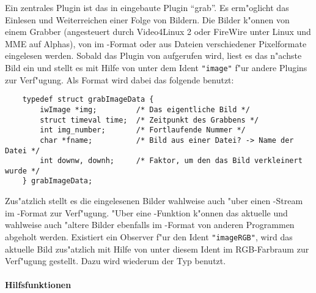 Ein zentrales Plugin ist das in \icewing{} eingebaute Plugin
``grab''. Es erm"oglicht das Einlesen und Weiterreichen einer Folge
von Bildern. Die Bilder k"onnen von einem Grabber (angesteuert durch
Video4Linux 2 oder FireWire unter Linux und MME auf Alphas), von
\dacs{} im -Format oder aus Dateien verschiedener
Pixelformate eingelesen werden. Sobald das Plugin von \icewing{}
aufgerufen wird, liest es das n"achste Bild ein und stellt es mit
Hilfe von  unter dem Ident \verb|"image"|
f"ur andere Plugins zur Verf"ugung. Als Format wird dabei das
folgende  benutzt:
\begin{small}
\linespread{0.9}
\begin{verbatim}
    typedef struct grabImageData {
        iwImage *img;         /* Das eigentliche Bild */
        struct timeval time;  /* Zeitpunkt des Grabbens */
        int img_number;       /* Fortlaufende Nummer */
        char *fname;          /* Bild aus einer Datei? -> Name der Datei */
        int downw, downh;     /* Faktor, um den das Bild verkleinert wurde */
    } grabImageData;
\end{verbatim}
\end{small}
Zus"atzlich stellt es die eingelesenen Bilder wahlweise auch "uber
einen \dacs-Stream im -Format zur Verf"ugung. "Uber
eine \dacs-Funktion k"onnen das aktuelle und wahlweise auch "altere
Bilder ebenfalls im -Format von anderen Programmen
abgeholt werden. Existiert ein Observer f"ur den Ident
\verb|"imageRGB"|, wird das aktuelle Bild zus"atzlich mit Hilfe von
 unter diesem Ident im RGB-Farbraum zur
Verf"ugung gestellt. Dazu wird wiederum der Typ 
benutzt.

\paragraph{Hilfsfunktionen}\hfill\\

